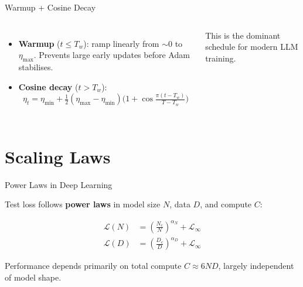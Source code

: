 \documentclass[aspectratio=169, professionalfonts]{beamer}
\begin{document}
\begin{frame}{Warmup + Cosine Decay}

\begin{columns}[c]
\begin{itemize}
  \item \textbf{Warmup} ($t \le T_w$):
    ramp linearly from $\sim\!0$ to $\eta_\text{max}$.
    Prevents large early updates before Adam stabilises.
  \item \textbf{Cosine decay} ($t > T_w$):
    $$\eta_t = \eta_\text{min}
      + \tfrac{1}{2}(\eta_\text{max}-\eta_\text{min})
        \bigl(1+\cos\tfrac{\pi(t-T_w)}{T-T_w}\bigr)$$
\end{itemize}

This is the dominant schedule for modern LLM training.

\end{columns}

\end{frame}

\section{Scaling Laws}

\begin{frame}{Power Laws in Deep Learning}

Test loss follows \textbf{power laws} in model size $N$,
data $D$, and compute $C$:

\begin{align*}
\mathcal{L}(N) &= \left(\frac{N_c}{N}\right)^{\!\alpha_N}
  + \mathcal{L}_\infty \\[4pt]
\mathcal{L}(D) &= \left(\frac{D_c}{D}\right)^{\!\alpha_D}
  + \mathcal{L}_\infty
\end{align*}

Performance depends primarily on total compute
$C \approx 6ND$, largely independent of model shape.

\end{frame}
\end{document}
